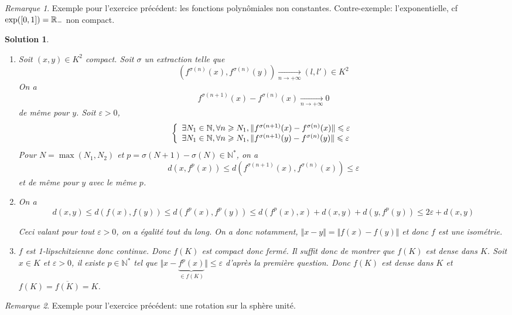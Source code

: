 \documentclass[12pt]{article}
\newtheorem{solution}{Solution}[section]
\theoremstyle{remark}
\newtheorem{remark}{Remarque}[section]
\newcommand{\N}{\mathbb{N}} \newcommand{\Z}{\mathbb{Z}}
\numberwithin{equation}{section}
\begin{document}
\begin{remark}
	Exemple pour l'exercice précédent: les fonctions polynômiales non constantes. Contre-exemple: l'exponentielle, cf $\exp([0,1])=\mathbb{R}_{-}$ non compact.
\end{remark}

\begin{solution}
	\phantom{}
	\begin{enumerate}
		\item 
		Soit $(x,y)\in K^{2}$ compact. Soit $\sigma$ un extraction telle que 
		$$(f^{\sigma(n)}(x),f^{\sigma(n)}(y))\xrightarrow[n\to+\infty]{}(l,l')\in K^{2}$$
		On a 
		$$f^{\sigma(n+1)}(x)-f^{\sigma(n)}(x)\xrightarrow[n\to+\infty]{}0$$
		de même pour $y$. Soit $\varepsilon>0$,
		$$
		\left\{
			\begin{array}[]{l}
				\exists N_{1}\in\N,\forall n\geqslant N_{1},\Vert f^{\sigma(n+1)}(x)-f^{\sigma(n)}(x)\Vert\leqslant\varepsilon\\
			\exists N_{1}\in\N,\forall n\geqslant N_{1},\Vert f^{\sigma(n+1)}(y)-f^{\sigma(n)}(y)\Vert\leqslant\varepsilon
		\end{array}
		\right.
		$$
		Pour $N=\max(N_{1},N_{2})$ et $p=\sigma(N+1)-\sigma(N)\in\N^{*}$, on a 
		\begin{equation*}
			d(x,f^{p}(x))\leqslant d(f^{\sigma(n+1)}(x),f^{\sigma(n)}(x))\leqslant\varepsilon
		\end{equation*}
		et de même pour $y$ avec le même $p$.
	
		\item On a 
		$$d(x,y)\leqslant d(f(x),f(y))\leqslant d(f^{p}(x),f^{p}(y))\leqslant d(f^{p}(x),x)+d(x,y)+d(y,f^{p}(y))\leqslant2\varepsilon+d(x,y)$$

		Ceci valant pour tout $\varepsilon>0$, on a égalité tout du long. On a donc notamment, $\Vert x-y\Vert=\Vert f(x)-f(y)\Vert$ et donc $f$ est une isométrie.

		\item $f$ est 1-lipschitzienne donc continue. Donc $f(K)$ est compact donc fermé. Il suffit donc de montrer que $f(K)$ est dense dans $K$. Soit $x\in K$ et $\varepsilon>0$, il existe $p\in\N^{*}$ tel que $\Vert x-\underbrace{f^{p}(x)}_{\in f(K)}\Vert\leqslant\varepsilon$ d'après la première question. Donc $f(K)$ est dense dans $K$ et $f(K)=\overline{f(K)}=K$.
	\end{enumerate}
\end{solution}

\begin{remark}
	Exemple pour l'exercice précédent: une rotation sur la sphère unité.
\end{remark}
\end{document}
